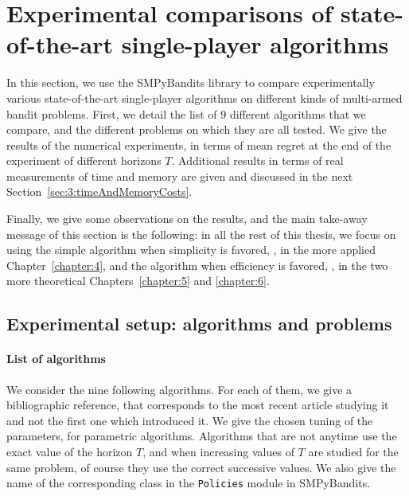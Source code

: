 \section{Experimental comparisons of state-of-the-art single-player algorithms}
\label{sec:3:reviewSPAlgorithms}


In this section, we use the SMPyBandits library to compare experimentally various state-of-the-art single-player algorithms on different kinds of multi-armed bandit problems.
First, we detail the list of $9$ different algorithms that we compare, and the different problems on which they are all tested.
We give the results of the numerical experiments, in terms of mean regret at the end of the experiment of different horizons $T$.
Additional results in terms of real measurements of time and memory are given and discussed in the next Section~\ref{sec:3:timeAndMemoryCosts}.

Finally, we give some observations on the results, and the main take-away message of this section is the following: in all the rest of this thesis, we focus on using the simple \UCB{} algorithm when simplicity is favored, \ie, in the more applied Chapter~\ref{chapter:4}, and the \klUCB{} algorithm when efficiency is favored, \ie, in the two more theoretical Chapters~\ref{chapter:5} and \ref{chapter:6}.


\subsection{Experimental setup: algorithms and problems}

\paragraph{List of algorithms}

We consider the nine following algorithms. For each of them, we give a bibliographic reference, that corresponds to the most recent article studying it and not the first one which introduced it.
We give the chosen tuning of the parameters, for parametric algorithms.
Algorithms that are not anytime use the exact value of the horizon $T$, and when increasing values of $T$ are studied for the same problem, of course they use the correct successive values.
We also give the name of the corresponding class in the \texttt{Policies} module in SMPyBandits.

